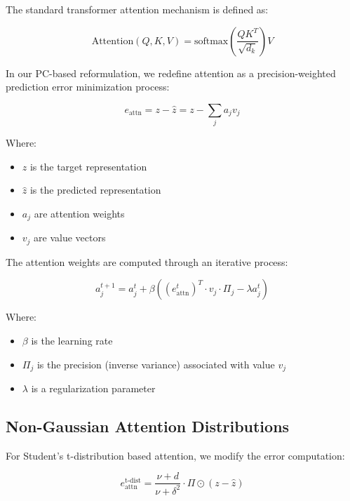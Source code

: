 \documentclass{article}
\begin{document}
The standard transformer attention mechanism is defined as:

\begin{equation}
  \text{Attention}(Q, K, V) = \text{softmax}\left(\frac{QK^T}{\sqrt{d_k}}\right)V
\end{equation}

In our PC-based reformulation, we redefine attention as a precision-weighted prediction error minimization process:

\begin{equation}
  e_{\text{attn}} = z - \hat{z} = z - \sum_{j} a_j v_j
\end{equation}

Where:
\begin{itemize}
  \item $z$ is the target representation
  \item $\hat{z}$ is the predicted representation
  \item $a_j$ are attention weights
  \item $v_j$ are value vectors
\end{itemize}

The attention weights are computed through an iterative process:

\begin{equation}
  a_j^{t+1} = a_j^t + \beta \left( (e_{\text{attn}}^t)^T \cdot v_j \cdot \Pi_j - \lambda a_j^t \right)
\end{equation}

Where:
\begin{itemize}
  \item $\beta$ is the learning rate
  \item $\Pi_j$ is the precision (inverse variance) associated with value $v_j$
  \item $\lambda$ is a regularization parameter
\end{itemize}

\subsection{Non-Gaussian Attention Distributions}

For Student's t-distribution based attention, we modify the error computation:

\begin{equation}
  e_{\text{attn}}^{\text{t-dist}} = \frac{\nu + d}{\nu + \delta^2} \cdot \Pi \odot (z - \hat{z})
\end{equation}
\end{document}
